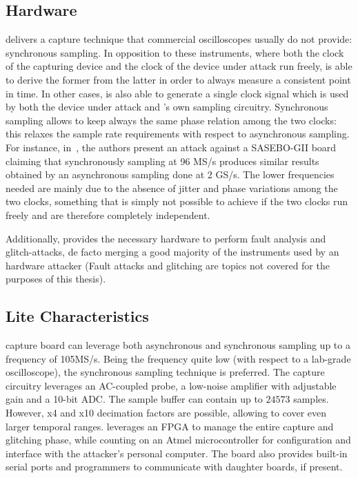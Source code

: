        \subsection{\cw{} Hardware}
            \cw{} delivers a capture technique that commercial oscilloscopes usually do not provide: synchronous sampling. In opposition to these instruments, where both the clock of the capturing device and the clock of the device under attack run freely, \cw{} is able to derive the former from the latter in order to always measure a consistent point in time. In other cases, \cw{} is also able to generate a single clock signal which is used by both the device under attack and \cw{}'s own sampling circuitry. Synchronous sampling allows to keep always the same phase relation among the two clocks: this relaxes the sample rate requirements with respect to asynchronous sampling. For instance, in~\cite{o2012case}, the authors present an attack against a SASEBO-GII board claiming that synchronously sampling at 96 MS/s produces similar results obtained by an asynchronous sampling done at 2 GS/s. The lower frequencies needed are mainly due to the absence of jitter and phase variations among the two clocks, something that is simply not possible to achieve if the two clocks run freely and are therefore completely independent.

            Additionally, \cw{} provides the necessary hardware to perform fault analysis and glitch-attacks, de facto merging a good majority of the instruments used by an hardware attacker (Fault attacks and glitching are topics not covered for the purposes of this thesis).

            \subsection{\cw{} Lite Characteristics}
                \cw{} capture board can leverage both asynchronous and synchronous sampling up to a frequency of 105MS/s. Being the frequency quite low (with respect to a lab-grade oscilloscope), the synchronous sampling technique is preferred. The capture circuitry leverages an AC-coupled probe, a low-noise amplifier with adjustable gain and a 10-bit ADC. The sample buffer can contain up to $24573$ samples. However, x4 and x10 decimation factors are possible, allowing to cover even larger temporal ranges. \cw{} leverages an FPGA to manage the entire capture and glitching phase, while counting on an Atmel microcontroller for configuration and interface with the attacker's personal computer. The board also provides built-in serial ports and programmers to communicate with daughter boards, if present.
                
